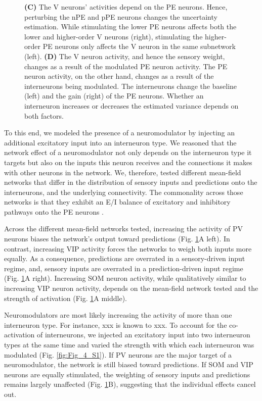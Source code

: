 \documentclass[10pt,a4paper,draft]{article}
\begin{document}
\begin{figure}[t!]
{{\bf (C)} The V neurons' activities depend on the PE neurons. Hence, perturbing the nPE and pPE neurons changes the uncertainty estimation. While stimulating the lower PE neurons affects both the lower and higher-order V neurons (right), stimulating the higher-order PE neurons only affects the V neuron in the same subnetwork (left).
{\bf (D)} The V neuron activity, and hence the sensory weight, changes as a result of the modulated PE neuron activity. The PE neuron activity, on the other hand, changes as a result of the interneurons being modulated. The interneurons change the baseline (left) and the gain (right) of the PE neurons. Whether an interneuron increases or decreases the estimated variance depends on both factors.
}
\label{fig:Fig_4}
\end{figure}
%

To this end, we modeled the presence of a neuromodulator by injecting an additional excitatory input into an interneuron type. We reasoned that the network effect of a neuromodulator not only depends on the interneuron type it targets but also on the inputs this neuron receives and the connections it makes with other neurons in the network. We, therefore, tested different mean-field networks that differ in the distribution of sensory inputs and predictions onto the interneurons, and the underlying connectivity. The commonality across those networks is that they exhibit an E/I balance of excitatory and inhibitory pathways onto the PE neurons \citep{hertag2022prediction}. 

Across the different mean-field networks tested, increasing the activity of PV neurons biases the network's output toward predictions (Fig. \ref{fig:Fig_4}A left). In contrast, increasing VIP activity forces the networks to weigh both inputs more equally. As a consequence, predictions are overrated in a sensory-driven input regime, and, sensory inputs are overrated in a prediction-driven input regime (Fig. \ref{fig:Fig_4}A right). Increasing SOM neuron activity, while qualitatively similar to increasing VIP neuron activity, depends on the mean-field network tested and the strength of activation (Fig. \ref{fig:Fig_4}A middle). 

Neuromodulators are most likely increasing the activity of more than one interneuron type. For instance, xxx is known to xxx. To account for the co-activation of interneurons, we injected an excitatory input into two interneuron types at the same time and varied the strength with which each interneuron was modulated (Fig. \ref{fig:Fig_4_S1}). If PV neurons are the major target of a neuromodulator, the network is still biased toward predictions. If SOM and VIP neurons are equally stimulated, the weighting of sensory inputs and predictions remains largely unaffected (Fig. \ref{fig:Fig_4}B), suggesting that the individual effects cancel out.
\end{document}
